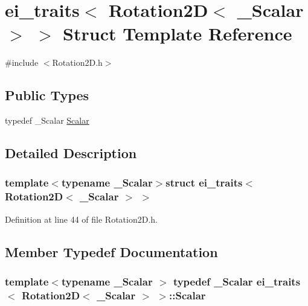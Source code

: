 \hypertarget{structei__traits_3_01_rotation2_d_3_01___scalar_01_4_01_4}{\section{ei\-\_\-traits$<$ Rotation2\-D$<$ \-\_\-\-Scalar $>$ $>$ Struct Template Reference}
\label{structei__traits_3_01_rotation2_d_3_01___scalar_01_4_01_4}
}


{\ttfamily \#include $<$Rotation2\-D.\-h$>$}

\subsection*{Public Types}
\begin{DoxyCompactItemize}
\item 
typedef \-\_\-\-Scalar \hyperlink{structei__traits_3_01_rotation2_d_3_01___scalar_01_4_01_4_aadbb2783298c05807b37e6381afaa805}{Scalar}
\end{DoxyCompactItemize}


\subsection{Detailed Description}
\subsubsection*{template$<$typename \-\_\-\-Scalar$>$struct ei\-\_\-traits$<$ Rotation2\-D$<$ \-\_\-\-Scalar $>$ $>$}



Definition at line 44 of file Rotation2\-D.\-h.



\subsection{Member Typedef Documentation}
\hypertarget{structei__traits_3_01_rotation2_d_3_01___scalar_01_4_01_4_aadbb2783298c05807b37e6381afaa805}{
\subsubsection[{Scalar}]{\setlength{\rightskip}{0pt plus 5cm}template$<$typename \-\_\-\-Scalar $>$ typedef \-\_\-\-Scalar {\bf ei\-\_\-traits}$<$ {\bf Rotation2\-D}$<$ \-\_\-\-Scalar $>$ $>$\-::{\bf Scalar}}}\label{structei__traits_3_01_rotation2_d_3_01___scalar_01_4_01_4_aadbb2783298c05807b37e6381afaa805}


